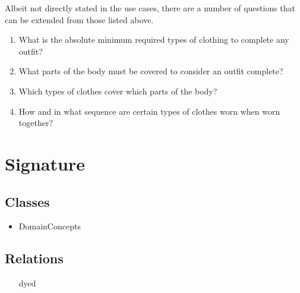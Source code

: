 \documentclass[paper=a4, fontsize=11pt]{scrartcl} %
\numberwithin{equation}{section} %
\numberwithin{figure}{section} %
\numberwithin{table}{section} %
\begin{document}
Albeit not directly stated in the use cases, there are a number of questions that can be extended from those listed above.
\begin{enumerate}
	\item What is the absolute minimum required types of clothing to complete any outfit?
	\item What parts of the body must be covered to consider an outfit complete?
	\item Which types of clothes cover which parts of the body?
	\item How and in what sequence are certain types of clothes worn when worn together?
\end{enumerate}

\section{Signature}
\subsection{Classes}
\begin{itemize}
	\item DomainConcepts
\end{itemize}
\subsection{Relations}
\begin{enumerate}
	\item[dyed]
\end{enumerate}
\end{document}
